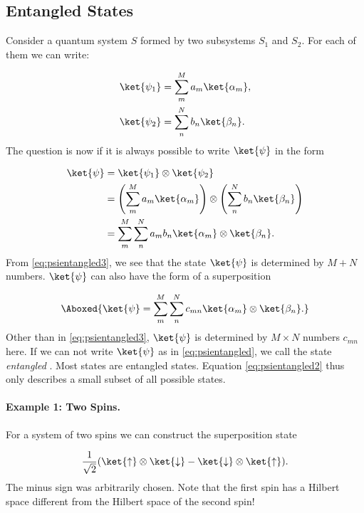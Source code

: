 \subsection{Entangled States}
 
			Consider a quantum system $S$ formed by two subsystems $S_1$ and $S_2$. For each of them we can write:

\begin{align}
				\ket{\psi_1}&=\sum_m^M a_m \ket{\alpha_m},\\
				\ket{\psi_2}&=\sum_n^N b_n \ket{\beta_n}.
			
\end{align}
			The question is now if it is always possible to write $\ket{\psi}$ in the form

\begin{align}
 \label{eq:psientangled} 
				\ket{\psi}	&=\ket{\psi_1}\otimes\ket{\psi_2}\\
							&=\left(\sum_m^M a_m \ket{\alpha_m}\right) \otimes \left(\sum_n^N b_n \ket{\beta_n}\right) \label{eq:psientangled2} \\
							&=\sum_m^M \sum_n^N a_m b_n \ket{\alpha_m} \otimes \ket{\beta_n}. \label{eq:psientangled3} 
			
\end{align}
						From \eqref{eq:psientangled3}, we see that the state $\ket{\psi}$ is determined by $M + N$ numbers. $\ket{\psi}$ can also have the form of a superposition

\begin{align}
				\Aboxed{\ket{\psi}=\sum_m^M \sum_n^N c_{mn}\ket{\alpha_m}\otimes \ket{\beta_n}.}
			
\end{align}
						Other than in \eqref{eq:psientangled3}, $\ket{\psi}$ is determined by $M \times N$ numbers $c_{mn}$ here. If we can not write $\ket{\psi}$ as in \eqref{eq:psientangled}, we call the state \emph{entangled} . Most states are entangled states. Equation \eqref{eq:psientangled2} thus only describes a small subset of all possible states.

\paragraph{Example 1: Two Spins.}\label{sec:examplespin}  For a system of two spins we can construct the superposition state

\begin{align}
						\frac{1}{\sqrt{2}}(\ket{\uparrow}\otimes\ket{\downarrow}-\ket{\downarrow}\otimes\ket{\uparrow}).
					
\end{align}
					The minus sign was arbitrarily chosen.
					Note that the first spin has a Hilbert space different from the Hilbert space of the second spin!
